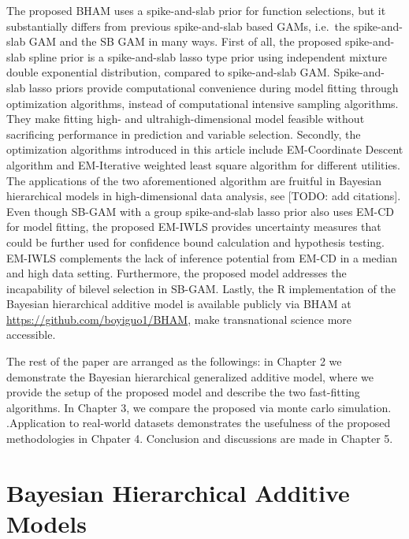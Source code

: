 \documentclass[AMA,STIX1COL,]{WileyNJD-v2}
\begin{document}
The proposed BHAM uses a spike-and-slab prior for function selections,
but it substantially differs from previous spike-and-slab based GAMs,
i.e.~the spike-and-slab GAM \citep{Scheipl2012} and the SB GAM
\citep{Bai2021} in many ways. First of all, the proposed spike-and-slab
spline prior is a spike-and-slab lasso type prior using independent
mixture double exponential distribution, compared to spike-and-slab GAM.
Spike-and-slab lasso priors provide computational convenience during
model fitting through optimization algorithms, instead of computational
intensive sampling algorithms. They make fitting high- and
ultrahigh-dimensional model feasible without sacrificing performance in
prediction and variable selection. Secondly, the optimization algorithms
introduced in this article include EM-Coordinate Descent algorithm and
EM-Iterative weighted least square algorithm for different utilities.
The applications of the two aforementioned algorithm are fruitful in
Bayesian hierarchical models in high-dimensional data analysis, see
{[}TODO: add citations{]}. Even though SB-GAM with a group
spike-and-slab lasso prior also uses EM-CD for model fitting, the
proposed EM-IWLS provides uncertainty measures that could be further
used for confidence bound calculation and hypothesis testing. EM-IWLS
complements the lack of inference potential from EM-CD in a median and
high data setting. Furthermore, the proposed model addresses the
incapability of bilevel selection in SB-GAM. Lastly, the R
implementation of the Bayesian hierarchical additive model is available
publicly via BHAM at \url{https://github.com/boyiguo1/BHAM}, make
transnational science more accessible.

The rest of the paper are arranged as the followings: in Chapter 2 we
demonstrate the Bayesian hierarchical generalized additive model, where
we provide the setup of the proposed model and describe the two
fast-fitting algorithms. In Chapter 3, we compare the proposed via monte
carlo simulation. .Application to real-world datasets demonstrates the
usefulness of the proposed methodologies in Chpater 4. Conclusion and
discussions are made in Chapter 5.

\hypertarget{bayesian-hierarchical-additive-models}{%
\section{Bayesian Hierarchical Additive
Models}\label{bayesian-hierarchical-additive-models}}
\end{document}
